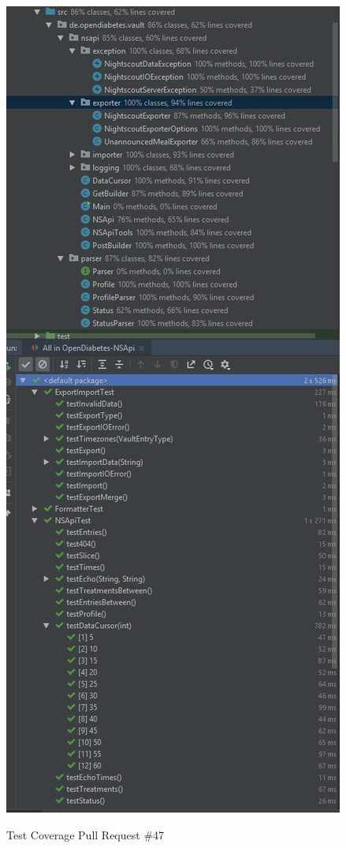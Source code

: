\documentclass[accentcolor=tud0b,12pt,paper=a4]{tudreport}
\begin{document}
\begin{figure}[h]
\centering
\caption{Test Coverage Pull Request \#47}
\includegraphics[width=\textwidth,height=\textheight,keepaspectratio]{pr-cov-47}
\label{pr-cov:47}
\end{figure}
	
\end{document}
